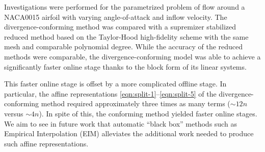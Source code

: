 \documentclass[onecolumn, twoside, a4paper, 11pt]{article}
\begin{document}
Investigations were performed for the parametrized problem of flow around a NACA0015 airfoil with
varying angle-of-attack and inflow velocity. The divergence-conforming method was compared with a
supremizer stabilized reduced method based on the Taylor-Hood high-fidelity scheme with the same
mesh and comparable polynomial degree. While the accuracy of the reduced methods were comparable,
the divergence-conforming model was able to achieve a significantly faster online stage thanks to
the block form of its linear systems.

This faster online stage is offset by a more complicated offline stage. In particular, the affine
representations \eqref{eqn:split-1}--\eqref{eqn:split-5} of the divergence-conforming method
required approximately three times as many terms ($\sim 12n$ versus $\sim 4n$). In spite of this,
the conforming method yielded faster online stages. We aim to see in future work that automatic
``black box'' methods such as Empirical Interpolation (EIM)
\cite{Barrault2004eim,Grepl2007erb,Maday2007gmi} \cite[Chapter 10]{Quarteroni2016rbm} alleviates the
additional work needed to produce such affine representations.



\end{document}
